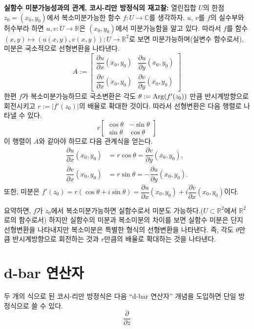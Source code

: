 {\bf 실함수 미분가능성과의 관계, 코시-리만 방정식의 재고찰:}
열린집합 $U$의 한점 $z_0=(x_0,y_0)$에서
복소미분가능한 함수 $f: U\to \mathbb C$를 생각하자.
$u$, $v$를 $f$의 실수부와 허수부라 하면
$u,v:U\to \mathbb R$은 $(x_0, y_0)$에서 미분가능함을 알고 있다.
따라서 $f$를 함수 $ (x,y) \mapsto (u(x,y), v(x,y)): U\to\mathbb R^2$로 보면
미분가능하며(실변수 함수로서), 미분은 국소적으로 선형변환을 나타낸다.
\[
A:= \begin{bmatrix}
\dfrac{\partial u}{\partial x}(x_0,y_0) & \dfrac{\partial u}{\partial y}(x_0,y_0) \\[1ex]
\dfrac{\partial v}{\partial x}(x_0,y_0) & \dfrac{\partial v}{\partial y}(x_0,y_0) 
\end{bmatrix}
\]
한편 $f$가 복소미분가능하므로 국소변환은 각도 $\theta:=\mathop{\mathrm{Arg}}(f'(z_0))$ 만큼 
반시계방향으로 회전시키고 $r:=|f'(z_0)|$의 배율로 확대한 것이다.
따라서 선형변환은 다음 행렬로 나타낼 수 있다.
\[
r\begin{bmatrix}
\cos\theta & - \sin\theta \\[1ex]
\sin\theta & \cos\theta
\end{bmatrix}
\]
이 행렬이 $A$와 같아야 하므로 다음 관계식을 얻는다.
\begin{align*}
\dfrac{\partial u}{\partial x}(x_0,y_0) &= r\cos\theta = \dfrac{\partial v}{\partial y}(x_0,y_0), \\
\dfrac{\partial v}{\partial x}(x_0,y_0) &= r\sin\theta = - \dfrac{\partial u}{\partial y}(x_0,y_0).
\end{align*}
또한, 미분은
$f'(z_0) = r(\cos\theta + i \sin\theta) = 
\dfrac{\partial u}{\partial x}(x_0,y_0) +i \dfrac{\partial v}{\partial x}(x_0,y_0)$이다.

요약하면, $f$가 $z_0$에서 복소미분가능하면
실함수로서 미분도 가능하다.($U\subset \mathbb R^2$에서 $\mathbb R^2$로의 함수로서)
하지만 실함수의 미분과 복소미분의 차이를 보면
실함수 미분은 단지 선형변환을 나타내지만 복소미분은 특별한 형식의 선형변환을 나타낸다.
즉, 각도 $\theta$만큼 반시계방향으로 회전하는 것과 $r$만큼의 배율로 확대하는 것을 나타낸다.

\section{d-bar 연산자}

두 개의 식으로 된 코시-리만 방정식은 다음 ``d-bar 연산자'' 개념을 도입하면
단일 방정식으로 쓸 수 있다.
\[
\dfrac\partial {\partial \bar z}
\]

